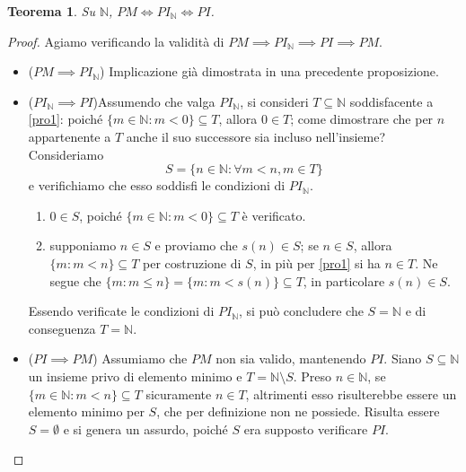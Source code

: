 \documentclass[fontsize = 11 pt, paper=A4, oneside, index=totoc, hyperref]{article}
\theoremstyle{definition}
\theoremstyle{plain}
\newtheorem{thm}{Teorema}[section]
\newcommand{\N}{\mathbb{N}}
\begin{document}
\begin{thm}
  Su \(\N\), \(PM \iff PI_\N \iff PI\).
\end{thm}
\begin{proof}
  Agiamo verificando la validità di \(PM \implies PI_\N \implies PI \implies PM\).
  \begin{itemize}
    \item{(\(PM \implies PI_\N\))\quad} Implicazione già dimostrata in una precedente proposizione.
    \item{(\(PI_\N \implies PI\))\quad}Assumendo che valga \(PI_\N\), si consideri \(T \subseteq \N\) soddisfacente a \eqref{pro1}: poiché \(\lbrace m \in \N \colon m < 0\rbrace \subseteq T\), allora \(0 \in T\); come dimostrare che per \(n\) appartenente a \(T\) anche il suo successore sia incluso nell'insieme? Consideriamo
    \[
    S = \lbrace n \in \N \colon \forall m < n, m \in T\rbrace
    \]
    e verifichiamo che esso soddisfi le condizioni di \(PI_\N\).
    \begin{enumerate}
      \item \(0 \in S\), poiché \(\lbrace m \in \N \colon m < 0\rbrace \subseteq T\) è verificato.
      \item supponiamo \(n \in S\) e proviamo che \(s(n) \in S\); se \(n \in S\), allora \(\lbrace m \colon m < n\rbrace \subseteq T\) per costruzione di \(S\), in più per \eqref{pro1} si ha \(n \in T\). Ne segue che \(\lbrace m \colon m \le n\rbrace = \lbrace m \colon m < s(n)\rbrace \subseteq T\), in particolare \(s(n) \in S\).
    \end{enumerate}
    Essendo verificate le condizioni di \(PI_\N\), si può concludere che \(S = \N\) e di conseguenza \(T = \N\).

    \item{(\(PI \implies PM\))\quad} Assumiamo che \(PM\) non sia valido, mantenendo \(PI\). Siano \(S \subseteq \N\) un insieme privo di elemento minimo e \(T = \N \setminus S\). Preso \(n \in \N\), se \(\lbrace m \in \N \colon m < n\rbrace \subseteq T\) sicuramente \(n \in T\), altrimenti esso risulterebbe essere un elemento minimo per \(S\), che per definizione non ne possiede. Risulta essere \(S = \emptyset\) e si genera un assurdo, poiché \(S\) era supposto verificare \(PI\).
\end{itemize}
  \end{proof}
\end{document}
